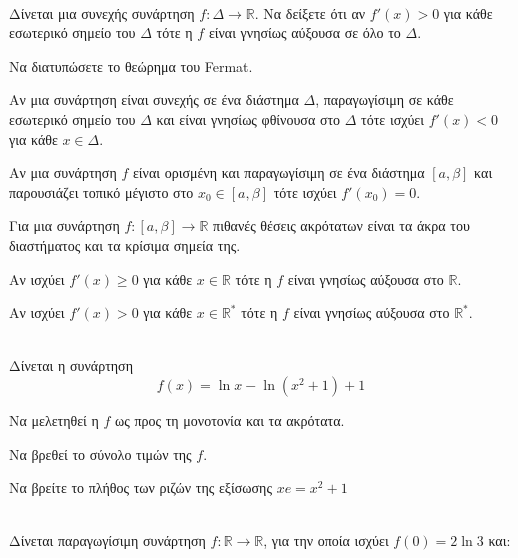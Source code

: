 \documentclass[twoside,nofonts,internet,math,spyros]{frontisthrio-diag}
\begin{document}
\begin{thema}
\item \mbox{}\\\vspace{-5mm}
\begin{erwthma}
\item Δίνεται μια συνεχής συνάρτηση $ f:\Delta\to\mathbb{R} $. Να δείξετε ότι αν $ f'(x)>0 $ για κάθε εσωτερικό σημείο του $ \Delta $ τότε η $ f $ είναι γνησίως αύξουσα σε όλο το $ \Delta $.
\item Να διατυπώσετε το θεώρημα του Fermat.
\item \swstolathospan
\begin{alist}
\item Αν μια συνάρτηση είναι συνεχής σε ένα διάστημα $ \varDelta $, παραγωγίσιμη σε κάθε εσωτερικό σημείο του $ \varDelta $ και είναι γνησίως φθίνουσα στο $ \varDelta $ τότε ισχύει $ f'(x)<0 $ για κάθε $ x\in\varDelta $.
\item Αν μια συνάρτηση $ f $ είναι ορισμένη και παραγωγίσιμη σε ένα διάστημα $ [a,\beta] $ και παρουσιάζει τοπικό μέγιστο στο $ x_0\in[a,\beta] $ τότε ισχύει $ f'(x_0)=0 $.
\item Για μια συνάρτηση $ f:[a,\beta]\to\mathbb{R} $ πιθανές θέσεις ακρότατων είναι τα άκρα του διαστήματος και τα κρίσιμα σημεία της. 
\item Αν ισχύει $ f'(x)\geq 0 $ για κάθε $ x\in\mathbb{R} $ τότε η $ f $ είναι γνησίως αύξουσα στο $ \mathbb{R} $.
\item Αν ισχύει $ f'(x)>0 $ για κάθε $ x\in\mathbb{R}^* $ τότε η $ f $ είναι γνησίως αύξουσα στο $ \mathbb{R}^* $.
\end{alist}
\end{erwthma}
\item\mbox{}\\
Δίνεται η συνάρτηση 
\[ f(x)=\ln{x}-\ln{\left( x^2+1\right)+1 } \]
\begin{erwthma}
\item Να μελετηθεί η $ f $ ως προς τη μονοτονία και τα ακρότατα.
\item Να βρεθεί το σύνολο τιμών της $ f $.
\item Να βρείτε το πλήθος των ριζών της εξίσωσης $ xe=x^2+1 $
\end{erwthma}
\item \mbox{}\\
Δίνεται παραγωγίσιμη συνάρτηση $ f:\mathbb{R}\to\mathbb{R} $, για την οποία ισχύει $ f(0)=2\ln{3} $ και:

\end{thema}
\end{document}
